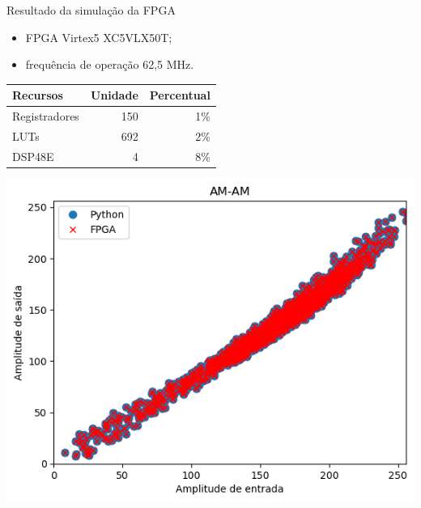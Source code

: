 \documentclass{if-beamer}
\begin{document}
\begin{frame}{Resultado da simulação da FPGA}
	\begin{minipage}{0.5\textwidth}
		\begin{itemize}
			\item FPGA Virtex5 XC5VLX50T;
			\item frequência de operação 62,5 MHz.
		\end{itemize}
		\begin{tabular}{|l|r|r|}
			\hline
			Recursos & Unidade & Percentual \\
			\hline
			Registradores & 150 & 1\% \\
			LUTs & 692 & 2\% \\
			DSP48E & 4 & 8\% \\
			\hline
		\end{tabular}
		
		
	\end{minipage}%
	\hspace{0.04\textwidth}
	\begin{minipage}{0.5\textwidth}
		\includegraphics[scale=0.40]{fpgasim.png}
	\end{minipage}
\end{frame}
\end{document}
